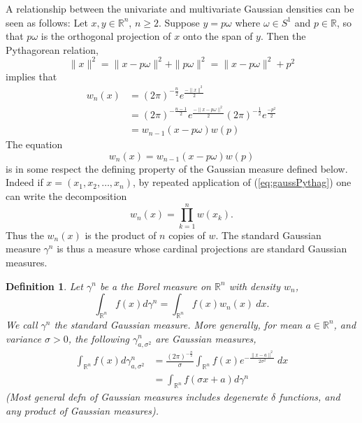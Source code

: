 \documentclass{amsart}
\newtheorem{definition}[theorem]{Definition}
\theoremstyle{remark}
\numberwithin{equation}{section}
\newcommand{\RR}{\mathbb{R}}
\begin{document}
A relationship between the univariate and multivariate Gaussian densities can be seen as follows: Let $x, y \in \RR^n$, $n \geq 2$. Suppose $y = p\omega$ where $\omega \in S^1$ and $p \in \RR$, so that $p\omega$ is the orthogonal projection of $x$ onto the span of $y$. Then the Pythagorean relation,
\[
    \|x\|^2 = \|x - p\omega\|^2 + \|p\omega\|^2 = \|x - p\omega\|^2 + p^2
\]
implies that
\begin{align*}
    w_n(x) 
    &= {(2\pi)}^{-\frac n2} e^{\frac{-\|x\|^2}2} \\
    &= {(2\pi)}^{-\frac{n-1}2} e^{\frac{-\|x - p\omega\|^2}2} {(2\pi)}^{-\frac12} e^{\frac{-p^2}2} \\
    &= w_{n-1}(x - p\omega)w(p)
\end{align*}
The equation
\begin{equation}\label{eq:gaussPythag}
    w_n(x) = w_{n-1}(x - p\omega)w(p)
\end{equation}
is in some respect the defining property of the Gaussian measure defined below. Indeed if $x = (x_1, x_2, \ldots, x_n)$, by repeated application of (\ref{eq:gaussPythag}) one can write the decomposition
\[
    w_n(x) = \prod_{k = 1}^n w(x_k).
\]
Thus the $w_n(x)$ is the product of $n$ copies of $w$. The standard Gaussian measure $\gamma^n$ is thus a measure whose cardinal projections are standard Gaussian measures.

\begin{definition}
Let $\gamma^n$ be a the Borel measure on $\RR^n$ with density $w_n$,
\[
    \int_{\RR^n} f(x) d\gamma^n = \int_{\RR^n} f(x) w_n(x) ~dx.
\]
We call $\gamma^n$ the standard Gaussian measure. More generally, for mean $a \in \RR^n$, and variance $\sigma > 0$, the following $\gamma^{n}_{a, \sigma^2}$ are Gaussian measures,
\begin{align*}
    \int_{\RR^n} f(x) d\gamma^n_{a,\sigma^2}
    &= \frac{{(2\pi)}^{-\frac n2}}{\sigma}  \int_{\RR^n} f(x) e^{-\frac{\|x - a\|^2}{2\sigma^2}} ~dx \\
    &= \int_{\RR^n} f(\sigma x + a) d\gamma^n
\end{align*}
(Most general defn of Gaussian measures includes degenerate $\delta$ functions, and any product of Gaussian measures).
\end{definition}



\end{document}
